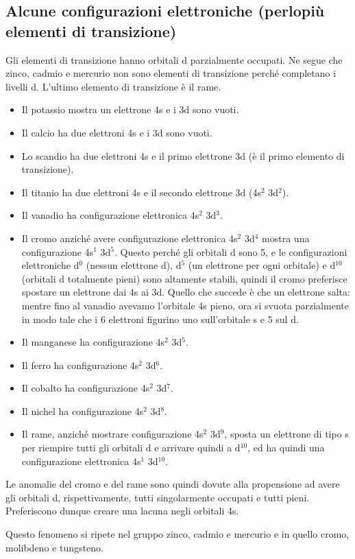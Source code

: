 \subsection{Alcune configurazioni elettroniche (perlopiù elementi di transizione)}
Gli elementi di transizione hanno orbitali d parzialmente occupati. Ne segue che zinco, cadmio e mercurio non sono elementi di transizione perché completano i livelli d. L'ultimo elemento di transizione è il rame.
\begin{itemize}
  \item Il potassio mostra un elettrone 4s e i 3d sono vuoti.
  \item Il calcio ha due elettroni 4s e i 3d sono vuoti.
  \item Lo scandio ha due elettroni 4s e il primo elettrone 3d (è il primo elemento di transizione).
  \item Il titanio ha due elettroni 4s e il secondo elettrone 3d (4s$^2$ 3d$^2$).
  \item Il vanadio ha configurazione elettronica 4s$^2$ 3d$^3$.
  \item Il cromo anziché avere configurazione elettronica 4s$^2$ 3d$^4$ mostra una configurazione 4s$^1$ 3d$^5$. Questo perché gli orbitali d sono 5, e le configurazioni elettroniche d$^0$ (nessun elettrone d), d$^5$ (un elettrone per ogni orbitale) e d$^{10}$ (orbitali d totalmente pieni) sono altamente stabili, quindi il cromo preferisce spostare un elettrone dai 4s ai 3d. Quello che succede è che un elettrone salta: mentre fino al vanadio avevamo l'orbitale 4s pieno, ora si svuota parzialmente in modo tale che i 6 elettroni figurino uno sull'orbitale s e 5 sul d.
  \item Il manganese ha configurazione 4s$^2$ 3d$^5$.
  \item Il ferro ha configurazione 4s$^2$ 3d$^6$.
  \item Il cobalto ha configurazione 4s$^2$ 3d$^7$.
  \item Il nichel ha configurazione 4s$^2$ 3d$^8$.
  \item Il rame, anziché mostrare configurazione 4s$^2$ 3d$^9$, sposta un elettrone di tipo s per riempire tutti gli orbitali d e arrivare quindi a d$^{10}$, ed ha quindi una configurazione elettronica 4s$^1$ 3d$^{10}$.
\end{itemize}
Le anomalie del cromo e del rame sono quindi dovute alla propensione ad avere gli orbitali d, rispettivamente, tutti singolarmente occupati e tutti pieni. Preferiscono dunque creare una lacuna negli orbitali 4s.

Questo fenomeno si ripete nel gruppo zinco, cadmio e mercurio e in quello cromo, molibdeno e tungsteno.
